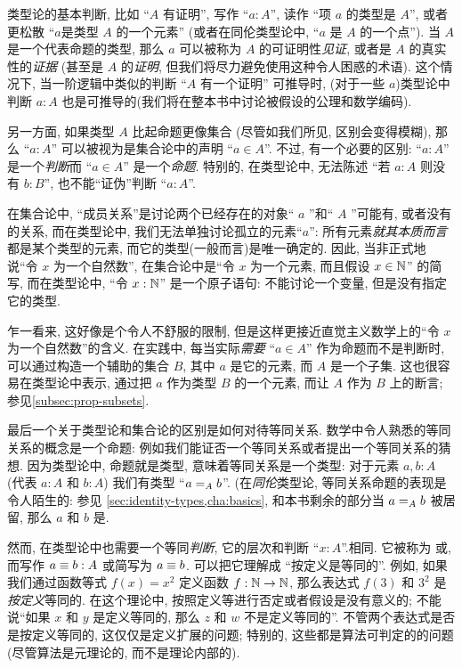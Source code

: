 类型论的基本判断, 比如 ``$A$ 有证明'', 写作 ``$a:A$'', 读作 ``项 $a$ 的类型是 $A$'', 或者更松散 ``$a$是类型 $A$ 的一个元素'' (或者在同伦类型论中, ``$a$ 是 $A$ 的一个点''). %
%
%
当 $A$ 是一个代表命题的类型, 那么 $a$ 可以被称为 $A$ 的可证明性\emph{见证}, 或者是 $A$ 的真实性的\emph{证据} (甚至是 $A$ 的\emph{证明}, 但我们将尽力避免使用这种令人困惑的术语). 这个情况下, 当一阶逻辑中类似的判断 ``$A$ 有一个证明'' 可推导时, (对于一些 $a$)类型论中判断 $a:A$ 也是可推导的(我们将在整本书中讨论被假设的公理和数学编码).

另一方面, 如果类型 $A$ 比起命题更像集合 (尽管如我们所见, 区别会变得模糊), 那么 ``$a:A$'' 可以被视为是集合论中的声明 ``$a\in A$''. 不过, 有一个必要的区别: ``$a:A$'' 是一个\emph{判断}而 ``$a\in A$'' 是一个\emph{命题}. 特别的, 在类型论中, 无法陈述 ``若 $a:A$ 则没有 $b:B$'', 也不能``证伪''判断 ``$a:A$''.

在集合论中, ``成员关系''是讨论两个已经存在的对象`` $a$ ''和`` $A$ ''可能有, 或者没有的关系, 而在类型论中, 我们无法单独讨论孤立的元素``$a$'': 所有元素\emph{就其本质而言}都是某个类型的元素, 而它的类型(一般而言)是唯一确定的. 因此, 当非正式地说``令 $x$ 为一个自然数'', 在集合论中是``令 $x$ 为一个元素, 而且假设 $x\in\nat$'' 的简写, 而在类型论中, ``令 $x:\nat$'' 是一个原子语句: 不能讨论一个变量, 但是没有指定它的类型.


乍一看来, 这好像是个令人不舒服的限制, 但是这样更接近直觉主义数学上的``令 $x$ 为一个自然数''的含义. 在实践中, 每当实际\emph{需要} ``$a\in A$'' 作为命题而不是判断时, 可以通过构造一个辅助的集合 $B$, 其中 $a$ 是它的元素, 而 $A$ 是一个子集. 这也很容易在类型论中表示, 通过把 $a$ 作为类型 $B$ 的一个元素, 而让 $A$ 作为 $B$ 上的断言;  参见\cref{subsec:prop-subsets}.

最后一个关于类型论和集合论的区别是如何对待等同关系. 数学中令人熟悉的等同关系的概念是一个命题:  例如我们能证否一个等同关系或者提出一个等同关系的猜想. 因为类型论中, 命题就是类型, 意味着等同关系是一个类型: 对于元素 $a,b:A$ (代表 $a:A$ 和 $b:A$) 我们有类型 ``$\id[A]ab$''. (在\emph{同伦}类型论, 等同关系命题的表现是令人陌生的: 参见 \cref{sec:identity-types,cha:basics}, 和本书剩余的部分当 $\id[A]ab$ 被居留, 那么 $a$ 和 $b$ 是. %
%

然而, 在类型论中也需要一个等同\emph{判断}, 它的层次和判断 ``$x:A$''.相同.%
它被称为 %
%
或, %
%
而写作 $a\jdeq b : A$ 或简写为 $a \jdeq b$. 可以把它理解成 ``按定义是等同的''. 例如, 如果我们通过函数等式 $f(x)=x^2$ 定义函数 $f:\nat\to\nat$, 那么表达式 $f(3)$ 和 $3^2$ 是\emph{按定义}等同的. 在这个理论中, 按照定义等进行否定或者假设是没有意义的; 不能说``如果 $x$ 和 $y$ 是定义等同的, 那么 $z$ 和 $w$ 不是定义等同的''. 不管两个表达式是否是按定义等同的, 这仅仅是定义扩展的问题; 特别的, 这些都是算法可判定的的问题(尽管算法是元理论的, 而不是理论内部的).

